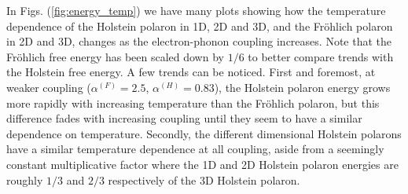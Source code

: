 In Figs. (\ref{fig:energy_temp}) we have many plots showing how the temperature dependence of the Holstein polaron in 1D, 2D and 3D, and the Fr\"ohlich polaron in 2D and 3D, changes as the electron-phonon coupling increases. Note that the Fr\"ohlich free energy has been scaled down by $1/6$ to better compare trends with the Holstein free energy. A few trends can be noticed. First and foremost, at weaker coupling ($\alpha^{(F)} = 2.5$, $\alpha^{(H)} = 0.83$), the Holstein polaron energy grows more rapidly with increasing temperature than the Fr\"ohlich polaron, but this difference fades with increasing coupling until they seem to have a similar dependence on temperature. Secondly, the different dimensional Holstein polarons have a similar temperature dependence at all coupling, aside from a seemingly constant multiplicative factor where the 1D and 2D Holstein polaron energies are roughly $1/3$ and $2/3$ respectively of the 3D Holstein polaron. 




